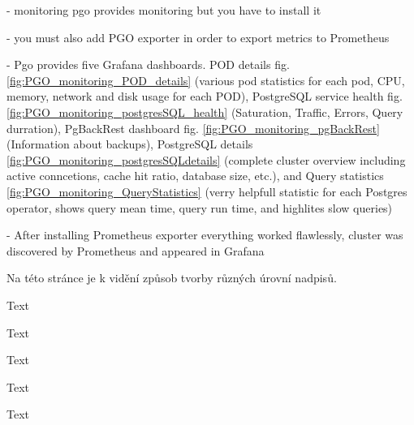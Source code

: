 - monitoring pgo provides monitoring but you have to install it

- you must also add PGO exporter in order to export metrics to Prometheus

- Pgo provides five Grafana dashboards. POD details fig. \ref{fig:PGO_monitoring_POD_details} (various pod statistics for each pod, CPU, memory, network and disk usage for each POD),
PostgreSQL service health fig. \ref{fig:PGO_monitoring_postgresSQL_health} (Saturation, Traffic, Errors, Query durration),
PgBackRest dashboard fig. \ref{fig:PGO_monitoring_pgBackRest} (Information about backups),
PostgreSQL details \ref{fig:PGO_monitoring_postgresSQLdetails} (complete cluster overview including active conncetions, cache hit ratio, database size, etc.),
and Query statistics \ref{fig:PGO_monitoring_QueryStatistics} (verry helpfull statistic for each Postgres operator, shows query mean time, query run time, and highlites slow queries)

- After installing Prometheus exporter everything worked flawlessly, cluster was discovered by Prometheus and appeared in Grafana












Na této stránce je k vidění způsob tvorby různých úrovní nadpisů.

Text

Text

Text

Text

Text

